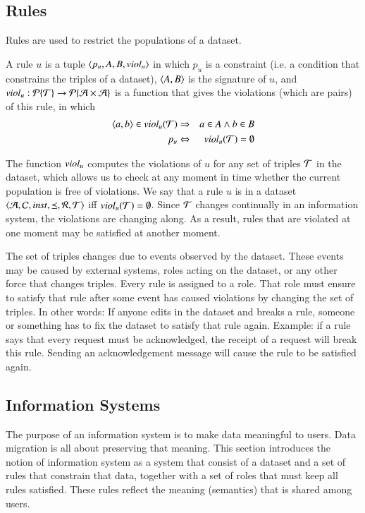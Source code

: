 \documentclass{elsarticle}
\begin{document}
\subsection{Rules}
\label{sct:Rules}
	Rules are used to restrict the populations of a dataset.
\begin{definition}[rule]
	\label{def:rule}
	\item A rule $u$ is a tuple $\langle p_u,A,B,\text{\it viol\/}_u\rangle$
	in which $p_u$ is a constraint (i.e. a condition that constrains the triples of a dataset),
	$\langle{A},{B}\rangle$ is the signature of $u$, and
	$\text{\it viol\/}_u:\cal{P}\{\mathcal{T}\}\rightarrow\cal{P}\{\mathcal{A}\times\mathcal{A}\}$ is a function that gives the violations (which are pairs) of this rule,
	in which
\begin{eqnarray}
	\langle{a},{b}\rangle\in\text{\it viol\/}_{u}(\mathcal{T})&\Rightarrow&a\in A\wedge b\in B\\
	p_u&\Leftrightarrow&\text{\it viol\/}_{u}(\mathcal{T})=\emptyset
\end{eqnarray}
\end{definition}
	The function $\text{\it viol\/}_u$ computes the violations of $u$ for any set of triples $\mathcal{T}$ in the dataset,
	which allows us to check at any moment in time whether the current population is free of violations.
	We say that a rule $u$ is  in a dataset $\langle\mathcal{A},\mathcal{C},\text{\it inst\/},\preceq,\mathcal{R},\mathcal{T}\rangle$ iff $\text{\it viol\/}_{u}(\mathcal{T})=\emptyset$.
	Since $\mathcal{T}$ changes continually in an information system, the violations are changing along.
	As a result, rules that are violated at one moment may be satisfied at another moment.

	The set of triples changes due to events observed by the dataset.
	These events may be caused by external systems, roles acting on the dataset, or any other force that changes triples.
	Every rule is assigned to a role.
	That role must ensure to satisfy that rule after some event has caused violations by changing the set of triples.
	In other words: If anyone edits in the dataset and breaks a rule, someone or something has to fix the dataset to satisfy that rule again.
	Example: if a rule says that every request must be acknowledged, the receipt of a request will break this rule.
	Sending an acknowledgement message will cause the rule to be satisfied again.

\subsection{Information Systems}
\label{sct:Information Systems}
	The purpose of an information system is to make data meaningful to users.
	Data migration is all about preserving that meaning.
	This section introduces the notion of information system
	as a system that consist of a dataset and a set of rules that constrain that data,
	together with a set of roles that must keep all rules satisfied.
	These rules reflect the meaning (semantics) that is shared among users.
\end{document}
